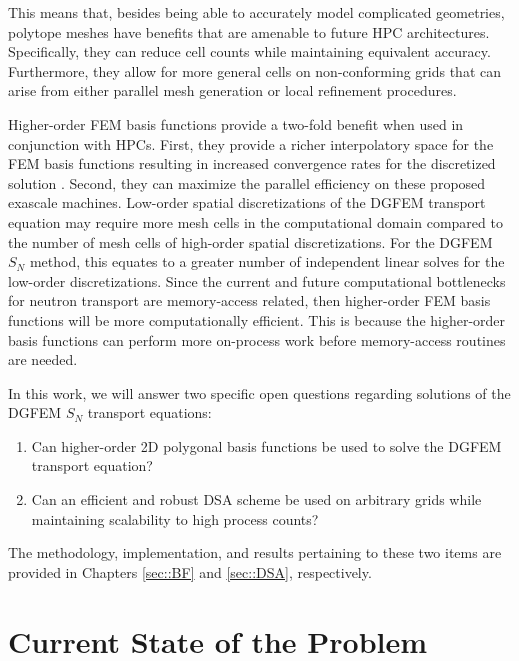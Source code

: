 \noindent This means that, besides being able to accurately model complicated geometries, polytope meshes have benefits that are amenable to future HPC architectures. Specifically, they can reduce cell counts while maintaining equivalent accuracy. Furthermore, they allow for more general cells on non-conforming grids that can arise from either parallel mesh generation or local refinement procedures.

Higher-order FEM basis functions provide a two-fold benefit when used in conjunction with HPCs. First, they provide a richer interpolatory space for the FEM basis functions resulting in increased convergence rates for the discretized solution \cite{ern2013theory}. Second, they can maximize the parallel efficiency on these proposed exascale machines. Low-order spatial discretizations of the DGFEM transport equation may require more mesh cells in the computational domain compared to the number of mesh cells of high-order spatial discretizations. For the DGFEM $S_N$ method, this equates to a greater number of independent linear solves for the low-order discretizations. Since the current and future computational bottlenecks for neutron transport are memory-access related, then higher-order FEM basis functions will be more computationally efficient. This is because the higher-order basis functions can perform more on-process work before memory-access routines are needed.

In this work, we will answer two specific open questions regarding solutions of the DGFEM $S_N$ transport equations:

\begin{enumerate}
\item Can higher-order 2D polygonal basis functions be used to solve the DGFEM transport equation?
\item Can an efficient and robust DSA scheme be used on arbitrary grids while maintaining scalability to high process counts?
\end{enumerate}

\noindent The methodology, implementation, and results pertaining to these two items are provided in Chapters \ref{sec::BF} and \ref{sec::DSA}, respectively.

\section{Current State of the Problem}
\label{sec::Intro_Past}

